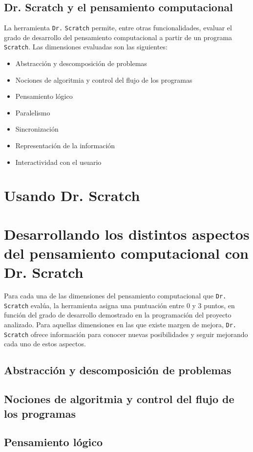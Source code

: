 \documentclass[a4paper,10pt]{article}
\begin{document}
\subsection*{Dr. Scratch y el pensamiento computacional}
La herramienta \texttt{Dr.}{\tiny{ }}\texttt{Scratch} permite, entre otras funcionalidades, evaluar el grado de desarrollo del pensamiento computacional a partir de un programa \texttt{Scratch}. Las dimensiones evaluadas son las siguientes:
\begin{itemize}
 \item Abstracción y descomposición de problemas
 \item Nociones de algoritmia y control del flujo de los programas
 \item Pensamiento lógico
 \item Paralelismo
 \item Sincronización
 \item Representación de la información
 \item Interactividad con el usuario
\end{itemize}

\section{Usando Dr. Scratch}

\section{Desarrollando los distintos aspectos del pensamiento computacional con Dr. Scratch}
Para cada una de las dimensiones del pensamiento computacional que \texttt{Dr.}{\tiny{ }}\texttt{Scratch} evalúa, la herramienta asigna una puntuación entre 0 y 3 puntos, en función del grado de desarrollo demostrado en la programación del proyecto analizado. Para aquellas dimensiones en las que existe margen de mejora, \texttt{Dr.}{\tiny{ }}\texttt{Scratch} ofrece información para conocer nuevas posibilidades y seguir mejorando cada uno de estos aspectos.
\subsection{Abstracción y descomposición de problemas}
\subsection{Nociones de algoritmia y control del flujo de los programas}
\subsection{Pensamiento lógico}
\end{document}
